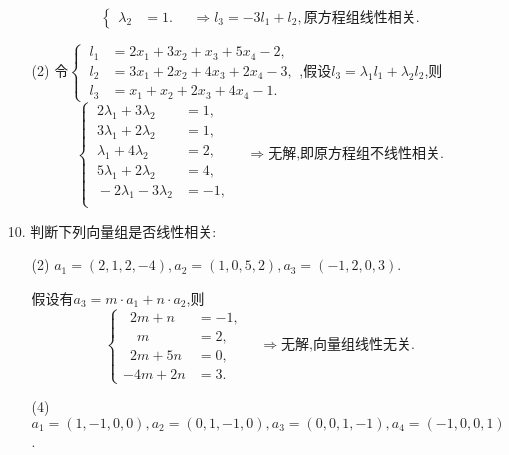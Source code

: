 \documentclass{article}
\begin{document}
\begin{enumerate}
\begin{enumerate}
\[\begin{cases}
                \lambda_2 &=1.
            \end{cases}
            \quad \Rightarrow
            l_3=-3l_1+l_2,\mbox{原方程组线性相关.}
        \]
        \item [(2)]令$\begin{cases}
            \ l_1 &=2x_1+3x_2+x_3+5x_4-2,\\
            \ l_2 &=3x_1+2x_2+4x_3+2x_4-3,\\
            \ l_3 &=x_1+x_2+2x_3+4x_4-1.
        \end{cases}$,假设$l_3=\lambda_1 l_1+\lambda_2 l_2$,则
        \[
            \begin{cases}
                \ 2\lambda_1+3\lambda_2 &=1 ,\\
                \ 3\lambda_1+2\lambda_2 &=1 ,\\
                \ \lambda_1+4\lambda_2 &=2 ,\\
                \ 5\lambda_1+2\lambda_2 &=4 ,\\
                \ -2\lambda_1-3\lambda_2 &= -1,\\
            \end{cases}
            \quad \Rightarrow
            \mbox{无解,即原方程组不线性相关.}
        \]
    \end{enumerate}
    \item [10.]判断下列向量组是否线性相关:
    \begin{enumerate}
        \item [(2)]$a_1=(2,1,2,-4),a_2=(1,0,5,2),a_3=(-1,2,0,3)$.
        
        假设有$a_3=m\cdot a_1+n\cdot a_2$,则
        \[
            \begin{cases}
                \ \;2m+n &=-1,\\
                \quad m &=2,\\
                \ \;2m+5n &=0,\\ 
                -4m+2n &=3.
            \end{cases} 
            \quad \Rightarrow
            \mbox{无解,向量组线性无关.}
        \]
        \item [(4)]$a_1=(1,-1,0,0),a_2=(0,1,-1,0),a_3=(0,0,1,-1),a_4=(-1,0,0,1)$.
        

\end{enumerate}
\end{enumerate}
\end{document}
